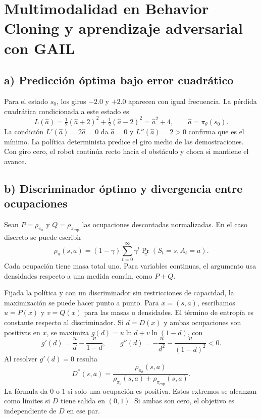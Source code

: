 \section{Multimodalidad en Behavior Cloning y aprendizaje adversarial con GAIL}

\subsection*{a) Predicción óptima bajo error cuadrático}

Para el estado $s_0$, los giros $-2.0$ y $+2.0$ aparecen con igual
frecuencia. La pérdida cuadrática condicionada a este estado es
\[
    L(\hat a)=\tfrac12(\hat a+2)^2+\tfrac12(\hat a-2)^2=\hat a^2+4,
    \qquad \hat a=\pi_\theta(s_0).
\]
La condición $L'(\hat a)=2\hat a=0$ da $\hat a=\boxed{0}$ y
$L''(\hat a)=2>0$ confirma que es el mínimo. La política determinista
predice el giro medio de las demostraciones. Con giro cero, el robot
continúa recto hacia el obstáculo y choca si mantiene el avance.

\subsection*{b) Discriminador óptimo y divergencia entre ocupaciones}

Sean $P=\rho_{\pi_\theta}$ y $Q=\rho_{\pi_{\mathrm{exp}}}$ las
ocupaciones descontadas normalizadas. En el caso discreto se puede
escribir
\[
    \rho_\pi(s,a)=(1-\gamma)\sum_{t=0}^{\infty}
         \gamma^t\Pr_\pi(S_t=s,A_t=a).
\]
Cada ocupación tiene masa total uno. Para variables continuas, el
argumento usa densidades respecto a una medida común, como $P+Q$.

Fijada la política y con un discriminador sin restricciones de
capacidad, la maximización se puede hacer punto a punto. Para
$x=(s,a)$, escribamos $u=P(x)$ y $v=Q(x)$ para las masas o densidades.
El término de entropía es constante respecto al discriminador. Si
$d=D(x)$ y ambas ocupaciones son positivas en $x$, se maximiza
$g(d)=u\ln d+v\ln(1-d)$, con
\[
    g'(d)=\frac{u}{d}-\frac{v}{1-d},
    \qquad
    g''(d)=-\frac{u}{d^2}-\frac{v}{(1-d)^2}<0.
\]
Al resolver $g'(d)=0$ resulta
\[
    \boxed{D^*(s,a)=
        \frac{\rho_{\pi_\theta}(s,a)}
        {\rho_{\pi_\theta}(s,a)+\rho_{\pi_{\mathrm{exp}}}(s,a)}}.
\]
La fórmula da $0$ o $1$ si solo una ocupación es positiva. Estos
extremos se alcanzan como límites si $D$ tiene salida en $(0,1)$. Si
ambas son cero, el objetivo es independiente de $D$ en ese par.

